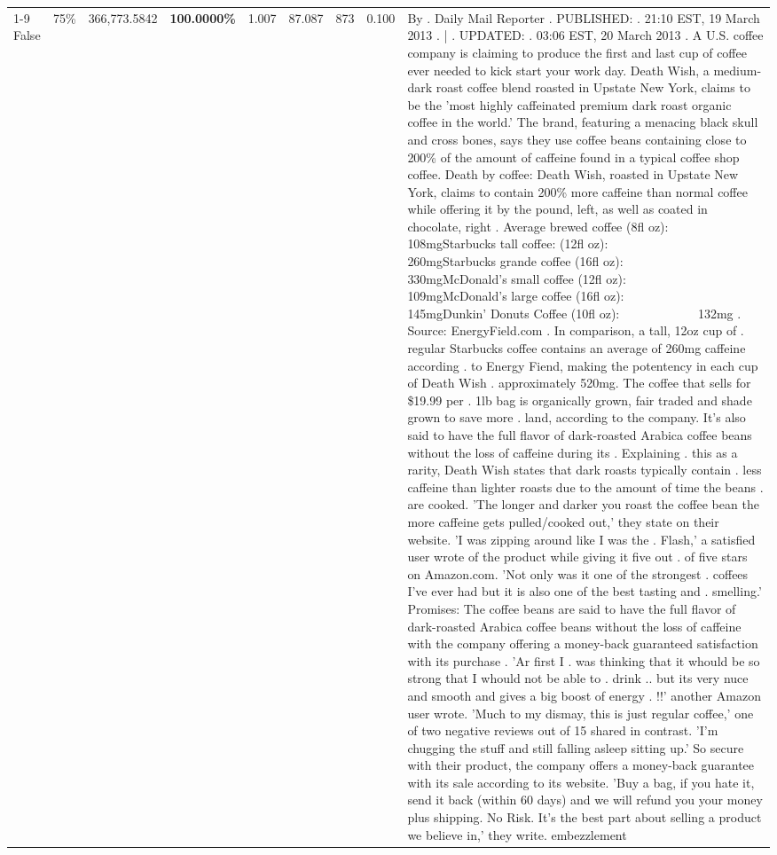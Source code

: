 \begin{table}[H]
{\begin{tabular}{lllrlllll}
\cline{1-9} \cline{2-9}
False & 75\% & 366,773.5842 & \bfseries \color{red} 100.0000\% & 1.007 & 87.087 & 873 & 0.100 & By . Daily Mail Reporter . PUBLISHED: . 21:10 EST, 19 March 2013 . | . UPDATED: . 03:06 EST, 20 March 2013 . A U.S. coffee company is claiming to produce the first and last cup of coffee ever needed to kick start your work day. Death Wish, a medium-dark roast coffee blend roasted in Upstate New York, claims to be the 'most highly caffeinated premium dark roast organic coffee in the world.' The brand, featuring a menacing black skull and cross bones, says they use coffee beans containing close to 200\% of the amount of caffeine found in a typical coffee shop coffee. Death by coffee: Death Wish, roasted in Upstate New York, claims to contain 200\% more caffeine than normal coffee while offering it by the pound, left, as well as coated in chocolate, right . Average brewed coffee (8fl oz):              108mgStarbucks tall coffee: (12fl oz):                260mgStarbucks grande coffee (16fl oz):         330mgMcDonald's small coffee (12fl oz):           109mgMcDonald's large coffee (16fl oz):           145mgDunkin' Donuts Coffee (10fl oz):             132mg . Source: EnergyField.com . In comparison, a tall, 12oz cup of . regular Starbucks coffee contains an average of 260mg caffeine according . to Energy Fiend, making the potentency in each cup of Death Wish . approximately 520mg. The coffee that sells for \$19.99 per . 1lb bag is organically grown, fair traded and shade grown to save more . land, according to the company. It's also said to have the full flavor of dark-roasted Arabica coffee beans without the loss of caffeine during its . Explaining . this as a rarity, Death Wish states that dark roasts typically contain . less caffeine than lighter roasts due to the amount of time the beans . are cooked. 'The longer and darker you roast the coffee bean the more caffeine gets pulled/cooked out,' they state on their website. 'I was zipping around like I was the . Flash,' a satisfied user wrote of the product while giving it five out . of five stars on Amazon.com. 'Not only was it one of the strongest . coffees I've ever had but it is also one of the best tasting and . smelling.’ Promises: The coffee beans are said to have the full flavor of dark-roasted Arabica coffee beans without the loss of caffeine with the company offering a money-back guaranteed satisfaction with its purchase . 'Ar first I . was thinking that it whould be so strong that I whould not be able to . drink .. but its very nuce and smooth and gives a big boost of energy . !!' another Amazon user wrote. 'Much to my dismay, this is just regular coffee,' one of two negative reviews out of 15 shared in contrast. 'I'm chugging the stuff and still falling asleep sitting up.' So secure with their product, the company offers a money-back guarantee with its sale according to its website. 'Buy a bag, if you hate it, send it back (within 60 days) and we will refund you your money plus shipping. No Risk. It’s the best part about selling a product we believe in,' they write. embezzlement \\

\end{tabular}}
\end{table}
